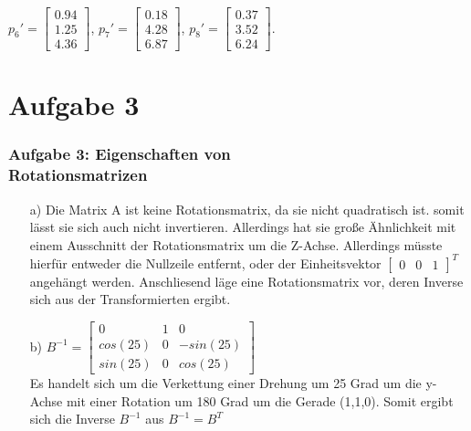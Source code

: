 \documentclass[accentcolor=tud9c,colorbacktitle,inverttitle,landscape,german,presentation,t]{tudbeamer}
\begin{document}
\begin{frame}
{	$p_6'=\begin{bmatrix}  0.94\\1.25 \\4.36 \end{bmatrix}$, %
	$p_7'=\begin{bmatrix}  0.18\\4.28 \\6.87 \end{bmatrix}$, %
	$p_8'=\begin{bmatrix}  0.37\\3.52 \\6.24 \end{bmatrix}$. %
}
	
\end{frame}

\section{Aufgabe 3}
\begin{frame}
	\frametitle{Aufgabe 3: Eigenschaften von \\ Rotationsmatrizen} 
	\begin{itemize}
		\item[a)] Die Matrix A ist keine Rotationsmatrix, da sie nicht quadratisch ist. somit lässt sie sich auch nicht invertieren. Allerdings hat sie große Ähnlichkeit mit einem Ausschnitt der Rotationsmatrix um die Z-Achse. Allerdings müsste hierfür entweder die Nullzeile entfernt, oder der Einheitsvektor $\begin{bmatrix} 0 & 0 & 1\end{bmatrix}^T$angehängt werden. Anschliesend läge eine Rotationsmatrix vor, deren Inverse sich aus der Transformierten ergibt.%
		\item[b)] $B^{-1}=\begin{bmatrix}
		0 & 1 & 0\\
		cos(25) & 0 & -sin(25)\\
		sin(25) & 0 & cos(25)
		\end{bmatrix} $ \\
		Es handelt sich um die Verkettung einer Drehung um 25 Grad um die y-Achse mit einer Rotation um 180 Grad um die Gerade (1,1,0). Somit ergibt sich die Inverse $B^{-1}$ aus $B^{-1}=B^{T} $
	\end{itemize}
\end{frame}
\end{document}
